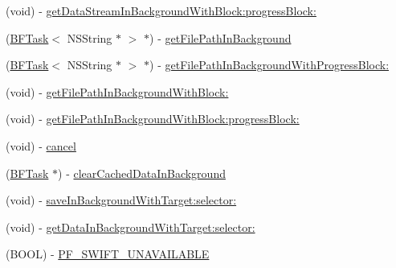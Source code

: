 \begin{DoxyCompactItemize}
\item 
(void) -\/ \hyperlink{interface_p_f_file_a0e80644cfcba5a26111ed8f7f54f4fce}{get\+Data\+Stream\+In\+Background\+With\+Block\+:progress\+Block\+:}
\item 
(\hyperlink{class_b_f_task}{B\+F\+Task}$<$ N\+S\+String $\ast$ $>$ $\ast$) -\/ \hyperlink{interface_p_f_file_a12a9a8e84058c9f76328982aecbc0df3}{get\+File\+Path\+In\+Background}
\item 
(\hyperlink{class_b_f_task}{B\+F\+Task}$<$ N\+S\+String $\ast$ $>$ $\ast$) -\/ \hyperlink{interface_p_f_file_aaf60de0863493ff9d75f537971380312}{get\+File\+Path\+In\+Background\+With\+Progress\+Block\+:}
\item 
(void) -\/ \hyperlink{interface_p_f_file_aece8c678203bcc9718093e13d6846668}{get\+File\+Path\+In\+Background\+With\+Block\+:}
\item 
(void) -\/ \hyperlink{interface_p_f_file_ab9252e548b64f3ffe17b4e22e1057611}{get\+File\+Path\+In\+Background\+With\+Block\+:progress\+Block\+:}
\item 
(void) -\/ \hyperlink{interface_p_f_file_a4bfb537da098271602f871f111e8b7d7}{cancel}
\begin{DoxyCompactList}\small\item\em 

 \end{DoxyCompactList}\item 
(\hyperlink{class_b_f_task}{B\+F\+Task} $\ast$) -\/ \hyperlink{interface_p_f_file_acf38e083a47b50edb2ebdc4c133e9c7d}{clear\+Cached\+Data\+In\+Background}
\begin{DoxyCompactList}\small\item\em 

 \end{DoxyCompactList}\item 
(void) -\/ \hyperlink{interface_p_f_file_a47dde8e577621ac0baac216731d1c8a5}{save\+In\+Background\+With\+Target\+:selector\+:}
\begin{DoxyCompactList}\small\item\em 

 \end{DoxyCompactList}\item 
(void) -\/ \hyperlink{interface_p_f_file_aca77cfbc8b945eb0c7f67301bb983d83}{get\+Data\+In\+Background\+With\+Target\+:selector\+:}
\begin{DoxyCompactList}\small\item\em 

 \end{DoxyCompactList}\item 
(B\+O\+O\+L) -\/ \hyperlink{interface_p_f_file_a90a09075c267b8640a6eb1babab5fb7a}{P\+F\+\_\+\+S\+W\+I\+F\+T\+\_\+\+U\+N\+A\+V\+A\+I\+L\+A\+B\+L\+E}
\begin{DoxyCompactList}\small\item\em 


\end{DoxyCompactList}
\end{DoxyCompactItemize}
